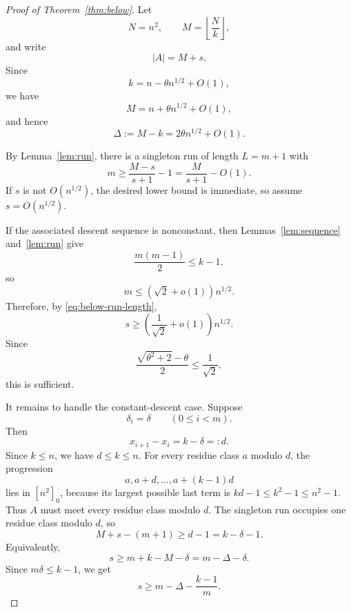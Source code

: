 \documentclass[10pt,a4paper]{amsart}
\newcommand{\floor}[1]{\left\lfloor #1\right\rfloor}
\numberwithin{equation}{section}
\begin{document}
\begin{proof}[Proof of Theorem~\ref{thm:below}]
Let
\[
        N=n^2,
        \qquad
        M=\floor{\frac{N}{k}},
\]
and write
\[
        |A|=M+s.
\]
Since
\[
        k=n-\theta n^{1/2}+O(1),
\]
we have
\[
        M=n+\theta n^{1/2}+O(1),
\]
and hence
\begin{equation}\label{eq:below-delta-M}
        \Delta:=M-k=2\theta n^{1/2}+O(1).
\end{equation}

By Lemma~\ref{lem:run}, there is a singleton run of length $L=m+1$ with
\begin{equation}\label{eq:below-run-length}
        m\ge \frac{M-s}{s+1}-1
        =
        \frac{M}{s+1}-O(1).
\end{equation}
If $s$ is not $O(n^{1/2})$, the desired lower bound is immediate, so assume $s=O(n^{1/2})$.

If the associated descent sequence is nonconstant, then Lemmas~\ref{lem:sequence} and~\ref{lem:run} give
\begin{equation}\label{eq:below-nonconstant-descent}
        \frac{m(m-1)}2\le k-1,
\end{equation}
so
\begin{equation}\label{eq:below-nonconstant-upper}
        m\le (\sqrt2+o(1))n^{1/2}.
\end{equation}
Therefore, by \eqref{eq:below-run-length},
\[
        s\ge \left(\frac1{\sqrt2}+o(1)\right)n^{1/2}.
\]
Since
\[
        \frac{\sqrt{\theta^2+2}-\theta}{2}\le \frac1{\sqrt2},
\]
this is sufficient.

It remains to handle the constant-descent case.
Suppose
\[
        \delta_i=\delta
        \qquad
        (0\le i<m).
\]
Then
\[
        x_{i+1}-x_i=k-\delta=:d.
\]
Since $k\le n$, we have $d\le k\le n$.
For every residue class $a$ modulo $d$, the progression
\[
        a,
        a+d,
        \ldots,
        a+(k-1)d
\]
lies in $[n^2]_0$, because its largest possible last term is $kd-1\le k^2-1\le n^2-1$.
Thus $A$ must meet every residue class modulo $d$.
The singleton run occupies one residue class modulo $d$, so
\[
        M+s-(m+1)
        \ge
        d-1
        =k-\delta-1.
\]
Equivalently,
\[
        s\ge m+k-M-\delta
        =m-\Delta-\delta.
\]
Since $m\delta\le k-1$, we get
\begin{equation}\label{eq:below-constant-bound}
        s\ge m-\Delta-\frac{k-1}{m}.
\end{equation}


\end{proof}
\end{document}
